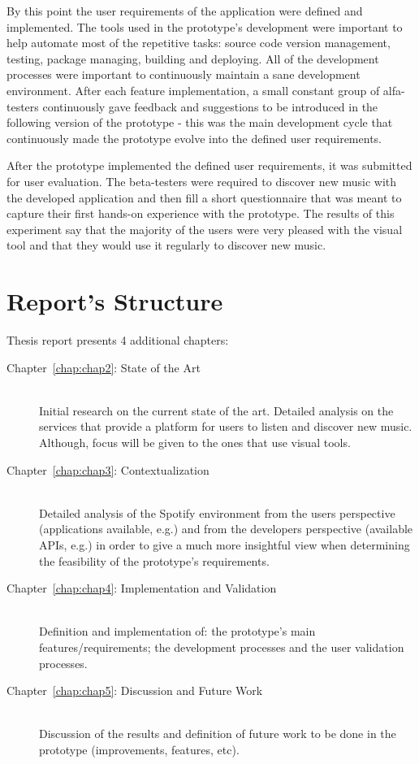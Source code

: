   By this point the user requirements of the application were defined and implemented.
  The tools used in the prototype's development were important to help automate most of the repetitive tasks: source code version management, testing, package managing, building and deploying.
  All of the development processes were important to continuously maintain a sane development environment.
  After each feature implementation, a small constant group of alfa-testers continuously gave feedback and suggestions to be introduced in the following version of the prototype - this was the main development cycle that continuously made the prototype evolve into the defined user requirements.

  After the prototype implemented the defined user requirements, it was submitted for user evaluation.
  The beta-testers were required to discover new music with the developed application and then fill a short questionnaire that was meant to capture their first hands-on experience with the prototype.
  The results of this experiment say that the majority of the users were very pleased with the visual tool and that they would use it regularly to discover new music.


\section{Report's Structure}
\label{sec:structure}
  
  Thesis report presents 4 additional chapters:

  \begin{description}
    \item[Chapter~\ref{chap:chap2}: State of the Art] \hfill \\
      Initial research on the current state of the art.
      Detailed analysis on the services that provide a platform for users to listen and discover new music.
      Although, focus will be given to the ones that use visual tools.
    \item[Chapter~\ref{chap:chap3}: Contextualization] \hfill \\
      Detailed analysis of the Spotify environment from the users perspective (applications available, e.g.) and from the developers perspective (available APIs, e.g.) in order to give a much more insightful view when determining the feasibility of the prototype's requirements.
    \item[Chapter~\ref{chap:chap4}: Implementation and Validation] \hfill \\
      Definition and implementation of: the prototype's main features/requirements; the development processes and the user validation processes.
    \item[Chapter~\ref{chap:chap5}: Discussion and Future Work] \hfill \\
      Discussion of the results and definition of future work to be done in the prototype (improvements, features, etc).
  \end{description}
